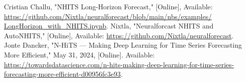 \begin{thebibliography}{00}
     Cristian Challu, "NHITS Long-Horizon Forecast," [Online], Available: \href{https://github.com/Nixtla/neuralforecast/blob/main/nbs/examples/LongHorizon_with_NHITS.ipynb}{https://github.com/Nixtla/neuralforecast/blob/main/nbs/examples/\\LongHorizon\_with\_NHITS.ipynb}.
     Nixtla, "Neuralforcast NHITS and AutoNHITS," [Online], Available: \href{https://github.com/Nixtla/neuralforecast}{https://github.com/Nixtla/neuralforecast}.
     Jonte Dancker, "N-HiTS — Making Deep Learning for Time Series Forecasting More Efficient," May 31, 2024, [Online]. Available: \href{https://towardsdatascience.com/n-hits-making-deep-learning-for-time-series-forecasting-more-efficient-d00956fc3e93}{https://towardsdatascience.com/n-hits-making-deep-learning-for-time-series-forecasting-more-efficient-d00956fc3e93}.

\end{thebibliography}
